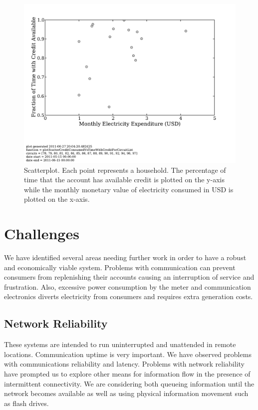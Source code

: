 \documentclass{sig-alternate}
\newcommand{\note}[1]{{\color{red} NOTE: *** #1 ***}}
\begin{document}
\begin{figure}[]
\begin{center}
\includegraphics[trim = 0in 1.3in 0in 0in, clip, width=\columnwidth]
                {figures/scatterCreditTime.pdf}
\end{center}
\caption{Scatterplot.  Each point represents a household.  The percentage
of time that the account has available credit is plotted on the y-axis while
the monthly monetary value of electricity consumed in USD is plotted on the x-axis.}
\label{scatterCreditTime}
\end{figure}


\section{Challenges}
We have identified several areas needing further work in order to have
a robust and economically viable system.  Problems with communication
can prevent consumers from replenishing their accounts causing 
an interruption of service and frustration.  Also, excessive
power consumption by the meter and communication electronics diverts
electricity from consumers and requires extra generation costs.

\subsection{Network Reliability}
These systems are intended to run uninterrupted and unattended in
remote locations.  Communication uptime is very important.  We have
observed problems with communications reliability and latency.
Problems with network reliability have prompted us to explore other
means for information flow in the presence of intermittent connectivity.
We are considering both queueing information until the network becomes
available as well as using physical information movement such as flash
drives.
\end{document}

